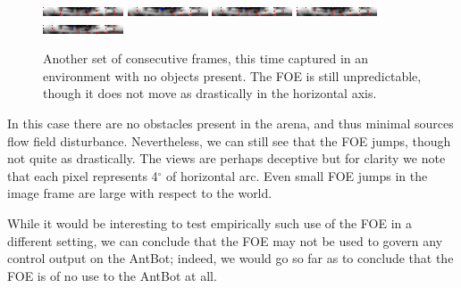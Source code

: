 \documentclass[a4paper,11pt,twoside,openright]{article}
\begin{document}
\begin{figure}[h!]
  \centering
  \includegraphics[width=\textwidth]{frame_00064}
  \includegraphics[width=\textwidth]{frame_00065}
  \includegraphics[width=\textwidth]{frame_00066}
  \includegraphics[width=\textwidth]{frame_00067}
  \includegraphics[width=\textwidth]{frame_00068}
  \caption{\label{fig:foeframesempty} Another set of consecutive
    frames, this time captured in an environment with no objects
    present. The FOE is still unpredictable, though it does not move
    as drastically in the horizontal axis.
  }
\end{figure}

In this case there are no obstacles present in the arena, and thus
minimal sources flow field disturbance. Nevertheless, we can still see
that the FOE jumps, though not quite as drastically.  The views are
perhaps deceptive but for clarity we note that each pixel represents
4$^\circ$ of horizontal arc. Even small FOE jumps in the image frame
are large with respect to the world.\newline\par

While it would be interesting to test empirically such use of the FOE
in a different setting, we can conclude that the FOE may not be used
to govern any control output on the AntBot; indeed, we would go so far
as to conclude that the FOE is of no use to the AntBot at all.
\newline\par
\end{document}
